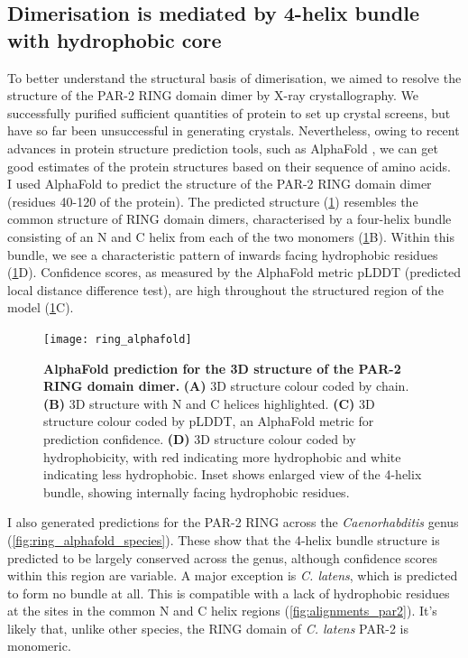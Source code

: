 \documentclass[12pt]{"report"}
\newcommand{\mycaption}[2]{\caption[#1]{\textbf{#1.} #2}}
\begin{document}
\subsection{Dimerisation is mediated by 4-helix bundle with hydrophobic core}

To better understand the structural basis of dimerisation, we aimed to resolve the structure of the PAR-2 RING domain dimer by X-ray crystallography. We successfully purified sufficient quantities of protein to set up crystal screens, but have so far been unsuccessful in generating crystals. Nevertheless, owing to recent advances in protein structure prediction tools, such as AlphaFold \citep{Jumper2021}, we can get good estimates of the protein structures based on their sequence of amino acids.\\

I used AlphaFold to predict the structure of the PAR-2 RING domain dimer (residues 40-120 of the protein). The predicted structure (\cref{fig:ring_alphafold}) resembles the common structure of RING domain dimers, characterised by a four-helix bundle consisting of an N and C helix from each of the two monomers (\cref{fig:ring_alphafold}B). Within this bundle, we see a characteristic pattern of inwards facing hydrophobic residues (\cref{fig:ring_alphafold}D). Confidence scores, as measured by the AlphaFold metric pLDDT (predicted local distance difference test), are high throughout the structured region of the model (\cref{fig:ring_alphafold}C).\\

\begin{figure}
\texttt{[image: ring\_alphafold]}
\centering
\mycaption{AlphaFold prediction for the 3D structure of the PAR-2 RING domain dimer}{
\textbf{(A)} 3D structure colour coded by chain.
\textbf{(B)} 3D structure with N and C helices highlighted.
\textbf{(C)} 3D structure colour coded by pLDDT, an AlphaFold metric for prediction confidence.
\textbf{(D)} 3D structure colour coded by hydrophobicity, with red indicating more hydrophobic and white indicating less hydrophobic. Inset shows enlarged view of the 4-helix bundle, showing internally facing hydrophobic residues.
}
\label{fig:ring_alphafold}
\end{figure}

I also generated predictions for the PAR-2 RING across the \textit{Caenorhabditis} genus (\cref{fig:ring_alphafold_species}). These show that the 4-helix bundle structure is predicted to be largely conserved across the genus, although confidence scores within this region are variable. A major exception is \textit{C. latens}, which is predicted to form no bundle at all. This is compatible with a lack of hydrophobic residues at the sites in the common N and C helix regions (\cref{fig:alignments_par2}). It's likely that, unlike other species, the RING domain of \textit{C. latens} PAR-2 is monomeric.\\
\end{document}
